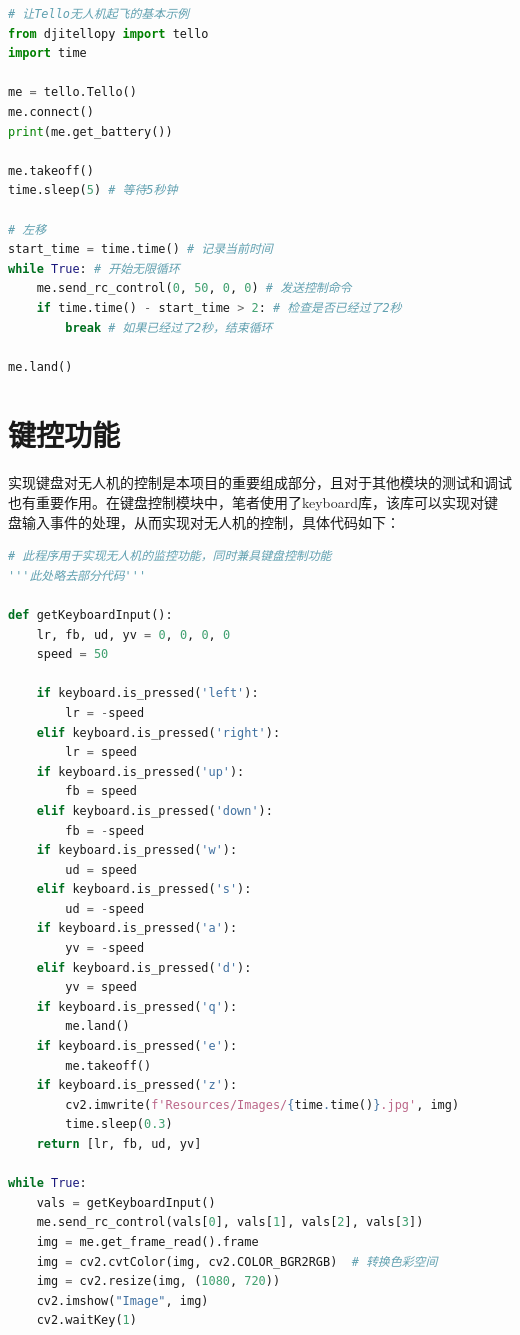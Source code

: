 \documentclass[report, twoside, UTF8, AutoFakeBold = 1, AutoFakeSlant, zihao = -4]{config}
\begin{document}
\begin{lstlisting}[language=Python, caption=FlyingDemo.py代码]
# 让Tello无人机起飞的基本示例
from djitellopy import tello
import time

me = tello.Tello()
me.connect()
print(me.get_battery())

me.takeoff()
time.sleep(5) # 等待5秒钟

# 左移
start_time = time.time() # 记录当前时间
while True: # 开始无限循环
    me.send_rc_control(0, 50, 0, 0) # 发送控制命令
    if time.time() - start_time > 2: # 检查是否已经过了2秒
        break # 如果已经过了2秒，结束循环

me.land()
\end{lstlisting}

\section{键控功能}
实现键盘对无人机的控制是本项目的重要组成部分，且对于其他模块的测试和调试也有重要作用。在键盘控制模块中，笔者使用了keyboard库，该库可以实现对键盘输入事件的处理，从而实现对无人机的控制，具体代码如下：

\begin{lstlisting}[language=Python, caption=Surveillance.py代码]
# 此程序用于实现无人机的监控功能，同时兼具键盘控制功能
'''此处略去部分代码'''

def getKeyboardInput():
    lr, fb, ud, yv = 0, 0, 0, 0
    speed = 50

    if keyboard.is_pressed('left'): 
        lr = -speed
    elif keyboard.is_pressed('right'):
        lr = speed
    if keyboard.is_pressed('up'):
        fb = speed
    elif keyboard.is_pressed('down'):
        fb = -speed
    if keyboard.is_pressed('w'):
        ud = speed
    elif keyboard.is_pressed('s'):
        ud = -speed
    if keyboard.is_pressed('a'):
        yv = -speed
    elif keyboard.is_pressed('d'):
        yv = speed
    if keyboard.is_pressed('q'):
        me.land()
    if keyboard.is_pressed('e'):
        me.takeoff()
    if keyboard.is_pressed('z'):
        cv2.imwrite(f'Resources/Images/{time.time()}.jpg', img)
        time.sleep(0.3)
    return [lr, fb, ud, yv]

while True:
    vals = getKeyboardInput()
    me.send_rc_control(vals[0], vals[1], vals[2], vals[3])
    img = me.get_frame_read().frame
    img = cv2.cvtColor(img, cv2.COLOR_BGR2RGB)  # 转换色彩空间
    img = cv2.resize(img, (1080, 720))
    cv2.imshow("Image", img)
    cv2.waitKey(1)
\end{lstlisting}
\end{document}
